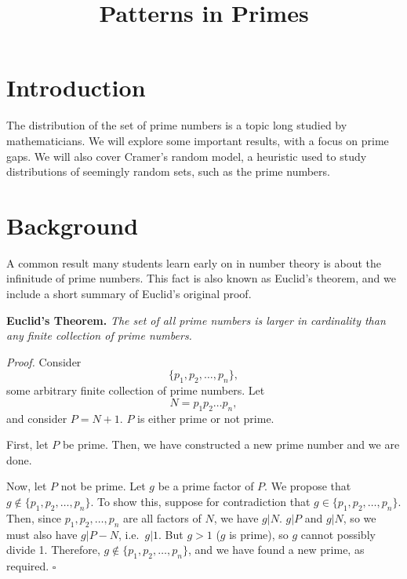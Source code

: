 \documentclass[conference]{IEEEtran}
\begin{document}
\hfuzz=500pt
\title{Patterns in Primes}
\author{
\and
{}
\and
{}
}

\maketitle

\begin{abstract}

\end{abstract}

\section{Introduction}
The distribution of the set of prime numbers is a topic long studied by mathematicians. We will explore some important results, with a focus on prime gaps. We will also cover Cramer's random model, a heuristic used to study distributions of seemingly random sets, such as the prime numbers. 

\section{Background}

A common result many students learn early on in number theory is about the
infinitude of prime numbers. This fact is also known as Euclid's theorem,
and we include a short summary of Euclid's original proof.

\medskip\noindent
\textbf{Euclid's Theorem.} \textit{The set of all prime numbers is larger
in cardinality than any finite collection of prime numbers.}

\smallskip\noindent
\textit{Proof.} Consider \[\{p_1, p_2, \dots, p_n\},\] some arbitrary finite
collection of
prime numbers. Let \[N = p_1p_2 \dots p_n,\] and consider $P = N + 1$. $P$ is
either prime or not prime.

First, let $P$ be prime. Then, we have constructed a new prime number and
we are done.

Now, let $P$ not be prime. Let $g$ be a prime factor of $P$. We propose that
$g \notin \{p_1, p_2, \dots, p_n\}$. To show this, suppose for contradiction that
$g \in \{p_1, p_2, \dots, p_n\}$. Then, since $p_1, p_2, \dots, p_n$ are all
factors of $N$, we have $g | N$. $g | P$ and $g | N$, so
we must also have $g | P - N$, i.e.\ $g | 1$. But $g > 1$ ($g$ is prime),
so $g$ cannot possibly divide 1. Therefore,
$g \notin \{p_1, p_2, \dots, p_n\}$, and we have found a new prime, as
required. \hfill$\square$\medskip
\end{document}
